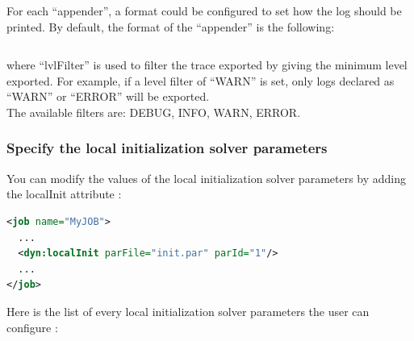 \documentclass[a4paper, 12pt]{report}
\begin{document}
\begin{itemize}
For each ``appender'', a format could be configured to set how the log should be printed. By default, the format of the ``appender'' is the following:
\begin{lstlisting}[numbers=none]
%Y-%m-%d %H:%M:%S | <lvlFilter> | log
\end{lstlisting}

where ``lvlFilter'' is used to filter the trace exported by giving the minimum level exported. For example, if a level filter of ``WARN'' is set, only logs declared as ``WARN'' or ``ERROR'' will be exported. \\

The available filters are: DEBUG, INFO, WARN, ERROR.
\end{itemize}

\subsubsection{Specify the local initialization solver parameters}

You can modify the values of the local initialization solver parameters by adding the localInit attribute :

\begin{lstlisting}[language=XML]
<job name="MyJOB">
  ...
  <dyn:localInit parFile="init.par" parId="1"/>
  ...
</job>
\end{lstlisting}

Here is the list of every local initialization solver parameters the user can configure :
\end{document}
